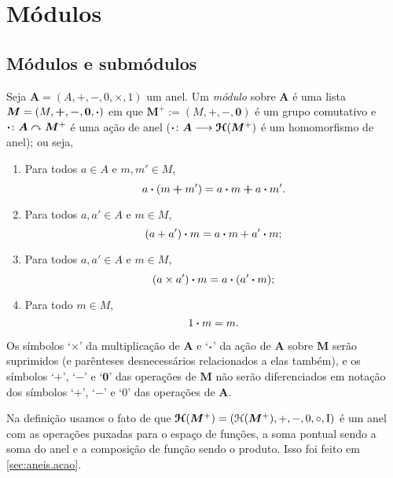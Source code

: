 \chapter{Módulos}

\section{Módulos e submódulos}

\begin{definition}
Seja $\bm A=(A,+,-,0,\times,1)$ um anel. Um \emph{módulo} sobre $\bm A$ é uma lista $\bm M = (M,\bm +,\bm -,\bm 0,\bm{\cdot})$ em que $\bm M^+ := (M,\bm +,\bm -,\bm 0)$ é um grupo comutativo e ${\bm{\cdot}}\colon {\bm A} \curvearrowright {\bm M^+}$ é uma ação de anel (${\bm{\cdot}}\colon {\bm A} \longrightarrow {\bm{\mathcal{H}}(\bm M^+)}$ é um homomorfismo de anel); ou seja,
	\begin{enumerate}
	\item Para todos $a \in A$ e $m,m' \in M$,
		\begin{equation*}
		a \bm{\cdot} (m \bm + m') = a \bm{\cdot} m \bm + a \bm{\cdot} m'.
		\end{equation*}
	\item Para todos $a,a' \in A$ e $m \in M$,
		\begin{equation*}
		(a + a') \bm{\cdot} m = a \bm{\cdot} m + a' \bm{\cdot} m;
		\end{equation*}
	\item Para todos $a,a' \in A$ e $m \in M$,
		\begin{equation*}
		(a \times a') \bm{\cdot} m = a \bm{\cdot} (a' \bm{\cdot} m);
		\end{equation*}
	\item Para todo $m \in M$,
		\begin{equation*}
		1 \bm{\cdot} m = m.
		\end{equation*}
	\end{enumerate}
Os símbolos `$\times$' da multiplicação de $\bm A$ e `$\bm{\cdot}$' da ação de $\bm A$ sobre $\bm M$ serão suprimidos (e parênteses desnecessários relacionados a elas também), e os símbolos `$\bm +$', `$\bm -$' e `$\bm 0$' das operações de $\bm M$ não serão diferenciados em notação dos símbolos `$+$', `$-$' e `$0$' das operações de $\bm A$.
\end{definition}

Na definição usamos o fato de que $\bm{\mathcal{H}}(\bm M^+) = (\mathcal{H}(\bm M^+),+,-,0,\circ,\mathrm{I})$ é um anel com as operações puxadas para o espaço de funções, a soma pontual sendo a soma do anel e a composição de função sendo o produto. Isso foi feito em \cref{sec:aneis.acao}.

